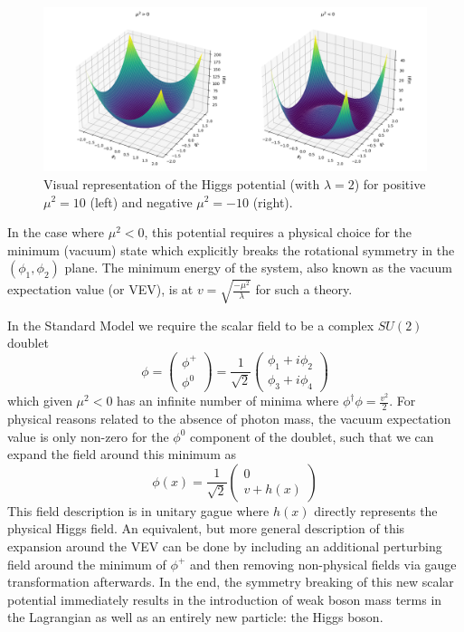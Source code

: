 \begin{figure}
\centering
    \includegraphics[width=1.0\textwidth]{images/Higgs_Potential.png}
    \caption{Visual representation of the Higgs potential (with $\lambda = 2$) for positive $\mu^2 = 10$ (left) and 
    negative $\mu^2 = -10$ (right).}
    \label{fig:Higgs_Potential}
\end{figure}

In the case where $\mu^2 < 0$, this potential requires a physical choice for the minimum (vacuum) state which 
explicitly breaks the rotational symmetry in the $(\phi_1, \phi_2)$ plane. The minimum energy of the system, also 
known as the vacuum expectation value (or VEV), is at $v = \sqrt{\frac{-\mu^2}{\lambda}}$ for such a theory. \par

In the Standard Model we require the scalar field to be a complex $SU(2)$ doublet
\begin{equation}
\phi = 
\begin{pmatrix} \phi^+  \\ \phi^0 \end{pmatrix}
= \frac{1}{\sqrt{2}}
\begin{pmatrix} \phi_1 + i\phi_2 \\ \phi_3 + i\phi_4 \end{pmatrix}
\end{equation}
which given $\mu^2 < 0$ has an infinite number of minima where $\phi^\dagger\phi = \frac{v^2}{2}$. For physical 
reasons related to the absence of photon mass, the vacuum expectation value is only non-zero for the $\phi^0$ 
component of the doublet, such that we can expand the field around this minimum as
\begin{equation}
\phi(x) = \frac{1}{\sqrt{2}}
\begin{pmatrix} 0 \\ v + h(x) \end{pmatrix}
\end{equation}
This field description is in unitary gague where $h(x)$ directly represents the physical Higgs field. An equivalent, 
but more general description of this expansion around the VEV can be done by including an additional perturbing 
field around the minimum of $\phi^+$ and then removing non-physical fields via gauge transformation afterwards. 
In the end, the symmetry breaking of this new scalar potential immediately results in the introduction of weak
boson mass terms in the Lagrangian as well as an entirely new particle: the Higgs boson.

